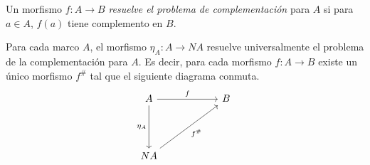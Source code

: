 Un morfismo $f\colon A\to B$ \emph{resuelve el problema de complementación} para $A$ si para $a\in A$, $f(a)$ tiene complemento en $B$.

\begin{thm}\label{Teorema6.2.2}
    Para cada marco $A$, el morfismo $\eta_A\colon A\to NA$ resuelve universalmente el problema de la complementación para $A$. Es decir, para cada morfismo $f\colon A\to B$ existe un único morfismo $f^\#$ tal que el siguiente diagrama conmuta.
    \[\begin{tikzcd}
	A && B \\
	& {} \\
	NA
	\arrow["f", from=1-1, to=1-3]
	\arrow["{\eta_A}"', from=1-1, to=3-1]
	\arrow["{f^\#}"', from=3-1, to=1-3]
\end{tikzcd}\]
\end{thm}

